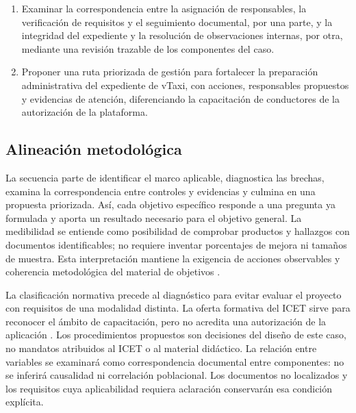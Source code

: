 {\begin{enumerate}
\item Examinar la correspondencia entre la asignación de responsables, la verificación de requisitos y el seguimiento documental, por una parte, y la integridad del expediente y la resolución de observaciones internas, por otra, mediante una revisión trazable de los componentes del caso.

\item Proponer una ruta priorizada de gestión para fortalecer la preparación administrativa del expediente de vTaxi, con acciones, responsables propuestos y evidencias de atención, diferenciando la capacitación de conductores de la autorización de la plataforma.

\end{enumerate}

\subsection{Alineación metodológica}

La secuencia parte de identificar el marco aplicable, diagnostica las brechas, examina la correspondencia entre controles y evidencias y culmina en una propuesta priorizada. Así, cada objetivo específico responde a una pregunta ya formulada y aporta un resultado necesario para el objetivo general. La medibilidad se entiende como posibilidad de comprobar productos y hallazgos con documentos identificables; no requiere inventar porcentajes de mejora ni tamaños de muestra. Esta interpretación mantiene la exigencia de acciones observables y coherencia metodológica del material de objetivos .

\par La clasificación normativa precede al diagnóstico para evitar evaluar el proyecto con requisitos de una modalidad distinta. La oferta formativa del ICET sirve para reconocer el ámbito de capacitación, pero no acredita una autorización de la aplicación . Los procedimientos propuestos son decisiones del diseño de este caso, no mandatos atribuidos al ICET o al material didáctico. La relación entre variables se examinará como correspondencia documental entre componentes: no se inferirá causalidad ni correlación poblacional. Los documentos no localizados y los requisitos cuya aplicabilidad requiera aclaración conservarán esa condición explícita.

}
